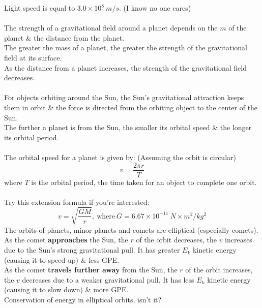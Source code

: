 \documentclass[a4paper,12pt]{article}
\begin{document}
\newpage 
Light speed is equal to \(3.0\times 10^8\ m/s\). (I know no one cares)\\\\
The strength of a gravitational field around a planet depends on the \(m\) of the planet \& the distance from the planet.\\
The greater the mass of a planet, the greater the strength of the gravitational field at its surface.\\
As the distance from a planet increases, the strength of the gravitational field decreases.\\\\
For objects orbiting around the Sun, the Sun's gravitational attraction keeps them in orbit \& the force is directed from the orbiting object to the center of the Sun.\\
The further a planet is from the Sun, the smaller its orbital speed \& the longer its orbital period.\\\\
The orbital speed for a planet is given by: (Assuming the orbit is circular)
\[v=\frac{2\pi r}{T}\]
where \(T\) is the orbital period, the time taken for an object to complete one orbit.\\\\
Try this extension formula if you're interested:
\[v=\sqrt{\frac{GM}{r}},\ \text{where}\ G=6.67 \times 10^{-11}\ N\times m^2/kg^2\]
The orbits of planets, minor planets and comets are elliptical (especially comets).\\
As the comet \textbf{approaches} the Sun, the \(r\) of the orbit decreases, the \(v\) increases due to the Sun's strong gravitational pull. It has greater \(E_k\) kinetic energy (causing it to speed up) \& less GPE.\\
As the comet \textbf{travels further away} from the Sun, the \(r\) of the orbit increases, the \(v\) decreases due to a weaker gravitational pull. It has less \(E_k\) kinetic energy (causing it to slow down) \& more GPE.\\
Conservation of energy in elliptical orbits, isn't it?
\end{document}
